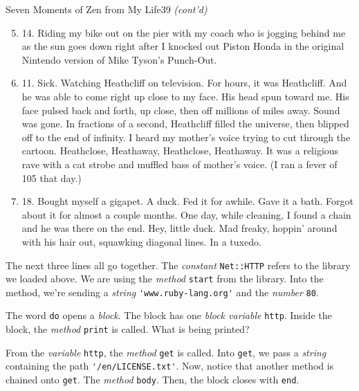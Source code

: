 \documentclass[10pt,twoside]{report}
\begin{document}
	\begin{sidebar}{Seven Moments of Zen from My Life}{39}
		\textit{(cont'd)}
		\begin{enumerate}
			\setcounter{enumi}{4}
			\item 14. Riding my bike out on the pier with my coach who is jogging behind me as the sun goes down right after I knocked out Piston Honda in the original Nintendo version of Mike Tyson's Punch-Out.
			\item 11. Sick. Watching Heathcliff on television. For hours, it was Heathcliff. And he was able to come right up close to my face. His head spun toward me. His face pulsed back and forth, up close, then off millions of miles away. Sound was gone. In fractions of a second, Heathcliff filled the universe, then blipped off to the end of infinity. I heard my mother's voice trying to cut through the cartoon. Heathclose, Heathaway, Heathclose, Heathaway. It was a religious rave with a cat strobe and muffled bass of mother's voice. (I ran a fever of 105 that day.)
			\item 18. Bought myself a gigapet. A duck. Fed it for awhile. Gave it a bath. Forgot about it for almost a couple months. One day, while cleaning, I found a chain and he was there on the end. Hey, little duck. Mad freaky, hoppin' around with his hair out, squawking diagonal lines. In a tuxedo.
		\end{enumerate}
	\end{sidebar}

The next three lines all go together.  The {\em constant}
\lstinline[breaklines=true]|Net::HTTP| refers to the library we loaded
above. We are using the {\em method}
\lstinline[breaklines=true]|start| from the library.  Into the method,
we're sending a {\em string}
\lstinline[breaklines=true]|'www.ruby-lang.org'| and the {\em number}
\lstinline[breaklines=true]|80|.

The word \lstinline[breaklines=true]|do| opens a {\em block}.  The
block has one {\em block variable} \lstinline[breaklines=true]|http|.
Inside the block, the {\em method} \lstinline[breaklines=true]|print|
is called.  What is being printed?

From the {\em variable} \lstinline[breaklines=true]|http|, the {\em
  method} \lstinline[breaklines=true]|get| is called.  Into
\lstinline[breaklines=true]|get|, we pass a {\em string} containing
the path \lstinline[breaklines=true]|'/en/LICENSE.txt'|.  Now, notice
that another method is chained onto \lstinline[breaklines=true]|get|.
The {\em method} \lstinline[breaklines=true]|body|.  Then, the block
closes with \lstinline[breaklines=true]|end|.
\end{document}
